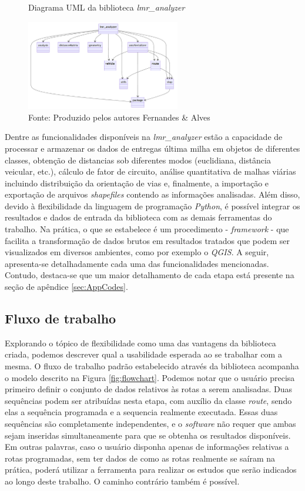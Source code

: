 \begin{figure}[H]
    \centering
    \caption{Diagrama UML da biblioteca \textit{lmr\_analyzer}}
    \includegraphics[width=0.6\textwidth]{images/4_materiais/lmr_analyzer/lmr_analyzer_UML.png}
    \caption*{Fonte: Produzido pelos autores Fernandes \& Alves}
    \label{fig:UMLPython}
\end{figure}

Dentre as funcionalidades disponíveis na \textit{lmr\_analyzer} estão a capacidade de processar e armazenar os dados de entregas última milha em objetos de diferentes classes, obtenção de distancias sob diferentes modos (euclidiana, distância veicular, etc.), cálculo de fator de circuito, análise quantitativa de malhas viárias incluindo distribuição da orientação de vias e, finalmente, a importação e exportação de arquivos \textit{shapefiles} contendo as informações analisadas.
%
Além disso, devido à flexibilidade da linguagem de programação \textit{Python}, é possível integrar os resultados e dados de entrada da biblioteca com as demais ferramentas do trabalho.
%
Na prática, o que se estabelece é um procedimento - \textit{framework} - que facilita a transformação de dados brutos em resultados tratados que podem ser visualizados em diversos ambientes, como por exemplo o \textit{QGIS}.
%
A seguir, apresenta-se detalhadamente cada uma das funcionalidades mencionadas. 
Contudo, destaca-se que um maior detalhamento de cada etapa está presente na seção de apêndice \ref{sec:AppCodes}.

\subsection{Fluxo de trabalho}

Explorando o tópico de flexibilidade como uma das vantagens da biblioteca criada, podemos descrever qual a usabilidade esperada ao se trabalhar com a mesma.
%
O fluxo de trabalho padrão estabelecido através da biblioteca acompanha o modelo descrito na Figura \ref{fig:flowchart}. 
%
Podemos notar que o usuário precisa primeiro definir o conjunto de dados relativos às rotas a serem analisadas.
%
Duas sequências podem ser atribuídas nesta etapa, com auxílio da classe \textit{route}, sendo elas a sequência programada e a sequencia realmente executada.
Essas duas sequências são completamente independentes, e o \textit{software} não requer que ambas sejam inseridas simultaneamente para que se obtenha os resultados disponíveis.
%
Em outras palavras, caso o usuário disponha apenas de informações relativas a rotas programadas, sem ter dados de como as rotas realmente se saíram na prática, poderá utilizar a ferramenta para realizar os estudos que serão indicados ao longo deste trabalho.
O caminho contrário também é possível.


